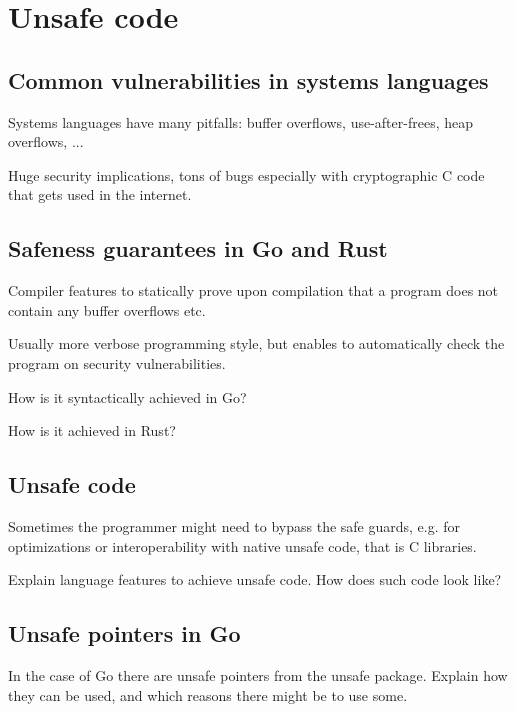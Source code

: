 
\chapter{Unsafe code}\label{ch:unsafe-code}



\section{Common vulnerabilities in systems languages}\label{sec:common-vulnerabilities}

Systems languages have many pitfalls: buffer overflows, use-after-frees, heap overflows,
...

Huge security implications, tons of bugs especially with cryptographic C code that gets
used in the internet.



\section{Safeness guarantees in Go and Rust}\label{sec:safeness-feature}

Compiler features to statically prove upon compilation that a program does not contain any
buffer overflows etc.

Usually more verbose programming style, but enables to automatically check the program
on security vulnerabilities.

How is it syntactically achieved in Go?

How is it achieved in Rust?



\section{Unsafe code}\label{sec:unsafe-code}

Sometimes the programmer might need to bypass the safe guards, e.g. for optimizations or
interoperability with native unsafe code, that is C libraries.

Explain language features to achieve unsafe code. How does such code look like?



\section{Unsafe pointers in Go}\label{sec:unsafe-pointers}

In the case of Go there are unsafe pointers from the unsafe package. Explain how they
can be used, and which reasons there might be to use some.
